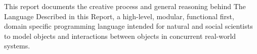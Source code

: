 \begin{center}
  This report documents the creative process and general reasoning behind The Language Described in this Report, a high-level, modular, functional first, domain specific programming language intended for natural and social scientists to model objects and interactions between objects in concurrent real-world systems.
\end{center}
